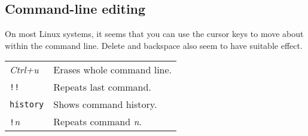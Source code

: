 \subsection*{Command-line editing}
On most Linux systems, it seems that you can use the cursor keys to move about within the command line.
Delete and backspace also seem to have suitable effect.

\smallskip \noindent
\begin{tabular}{l|l}
 \textit{Ctrl+u} & Erases whole command line. \\
 \texttt{!!} & Repeats last command. \\
 \texttt{history} & Shows command history. \\
 \texttt{!}\textit{n} & Repeats command \textit{n}. \\
\end{tabular}
